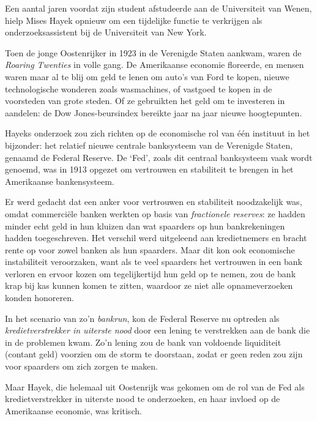 \documentclass[smalldemyvopaper,11pt,twoside,onecolumn,openright,extrafontsizes,hidelinks]{memoir}
\begin{document}
Een aantal jaren voordat zijn student afstudeerde aan de Universiteit
van Wenen, hielp Mises Hayek opnieuw om een tijdelijke functie te
verkrijgen als onderzoeksassistent bij de Universiteit van New York.

Toen de jonge Oostenrijker in 1923 in de Verenigde Staten aankwam, waren
de \emph{Roaring Twenties} in volle gang. De Amerikaanse economie
floreerde, en mensen waren maar al te blij om geld te lenen om auto's
van Ford te kopen, nieuwe technologische wonderen zoals wasmachines, of
vastgoed te kopen in de voorsteden van grote steden. Of ze gebruikten
het geld om te investeren in aandelen: de Dow Jones-beursindex bereikte
jaar na jaar nieuwe hoogtepunten.

Hayeks onderzoek zou zich richten op de economische rol van één
instituut in het bijzonder: het relatief nieuwe centrale banksysteem van
de Verenigde Staten, genaamd de Federal Reserve. De `Fed', zoals dit
centraal banksysteem vaak wordt genoemd, was in 1913 opgezet om
vertrouwen en stabiliteit te brengen in het Amerikaanse bankensysteem.

Er werd gedacht dat een anker voor vertrouwen en stabiliteit
noodzakelijk was, omdat commerciële banken werkten op basis van
\emph{fractionele reserves}: ze hadden minder echt geld in hun kluizen
dan wat spaarders op hun bankrekeningen hadden toegeschreven. Het
verschil werd uitgeleend aan kredietnemers en bracht rente op voor zowel
banken als hun spaarders. Maar dit kon ook economische instabiliteit
veroorzaken, want als te veel spaarders het vertrouwen in een bank
verloren en ervoor kozen om tegelijkertijd hun geld op te nemen, zou de
bank krap bij kas kunnen komen te zitten, waardoor ze niet alle
opnameverzoeken konden honoreren.

In het scenario van zo'n \emph{bankrun}, kon de Federal Reserve nu
optreden als \emph{kredietverstrekker in uiterste nood} door een lening
te verstrekken aan de bank die in de problemen kwam. Zo'n lening zou de
bank van voldoende liquiditeit (contant geld) voorzien om de storm te
doorstaan, zodat er geen reden zou zijn voor spaarders om zich zorgen te
maken.

Maar Hayek, die helemaal uit Oostenrijk was gekomen om de rol van de Fed
als kredietverstrekker in uiterste nood te onderzoeken, en haar invloed
op de Amerikaanse economie, was kritisch.
\end{document}
